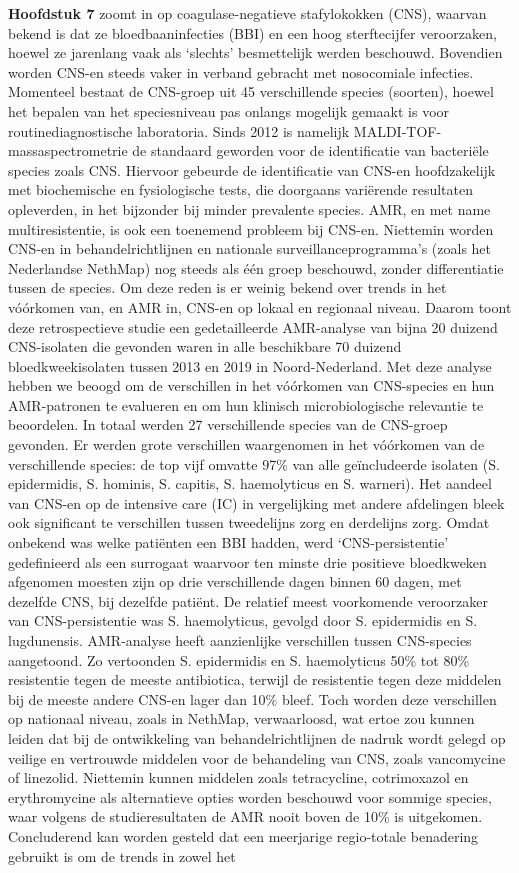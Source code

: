 \documentclass[
]{book}
\begin{document}
\textbf{Hoofdstuk 7} zoomt in op coagulase-negatieve stafylokokken (CNS), waarvan bekend is dat ze bloedbaaninfecties (BBI) en een hoog sterftecijfer veroorzaken, hoewel ze jarenlang vaak als `slechts' besmettelijk werden beschouwd. Bovendien worden CNS-en steeds vaker in verband gebracht met nosocomiale infecties. Momenteel bestaat de CNS-groep uit 45 verschillende species (soorten), hoewel het bepalen van het speciesniveau pas onlangs mogelijk gemaakt is voor routinediagnostische laboratoria. Sinds 2012 is namelijk MALDI-TOF-massaspectrometrie de standaard geworden voor de identificatie van bacteriële species zoals CNS. Hiervoor gebeurde de identificatie van CNS-en hoofdzakelijk met biochemische en fysiologische tests, die doorgaans variërende resultaten opleverden, in het bijzonder bij minder prevalente species. AMR, en met name multiresistentie, is ook een toenemend probleem bij CNS-en. Niettemin worden CNS-en in behandelrichtlijnen en nationale surveillanceprogramma's (zoals het Nederlandse NethMap) nog steeds als één groep beschouwd, zonder differentiatie tussen de species. Om deze reden is er weinig bekend over trends in het vóórkomen van, en AMR in, CNS-en op lokaal en regionaal niveau. Daarom toont deze retrospectieve studie een gedetailleerde AMR-analyse van bijna 20 duizend CNS-isolaten die gevonden waren in alle beschikbare 70 duizend bloedkweekisolaten tussen 2013 en 2019 in Noord-Nederland. Met deze analyse hebben we beoogd om de verschillen in het vóórkomen van CNS-species en hun AMR-patronen te evalueren en om hun klinisch microbiologische relevantie te beoordelen. In totaal werden 27 verschillende species van de CNS-groep gevonden. Er werden grote verschillen waargenomen in het vóórkomen van de verschillende species: de top vijf omvatte 97\% van alle geïncludeerde isolaten (S. epidermidis, S. hominis, S. capitis, S. haemolyticus en S. warneri). Het aandeel van CNS-en op de intensive care (IC) in vergelijking met andere afdelingen bleek ook significant te verschillen tussen tweedelijns zorg en derdelijns zorg. Omdat onbekend was welke patiënten een BBI hadden, werd `CNS-persistentie' gedefinieerd als een surrogaat waarvoor ten minste drie positieve bloedkweken afgenomen moesten zijn op drie verschillende dagen binnen 60 dagen, met dezelfde CNS, bij dezelfde patiënt. De relatief meest voorkomende veroorzaker van CNS-persistentie was S. haemolyticus, gevolgd door S. epidermidis en S. lugdunensis. AMR-analyse heeft aanzienlijke verschillen tussen CNS-species aangetoond. Zo vertoonden S. epidermidis en S. haemolyticus 50\% tot 80\% resistentie tegen de meeste antibiotica, terwijl de resistentie tegen deze middelen bij de meeste andere CNS-en lager dan 10\% bleef. Toch worden deze verschillen op nationaal niveau, zoals in NethMap, verwaarloosd, wat ertoe zou kunnen leiden dat bij de ontwikkeling van behandelrichtlijnen de nadruk wordt gelegd op veilige en vertrouwde middelen voor de behandeling van CNS, zoals vancomycine of linezolid. Niettemin kunnen middelen zoals tetracycline, cotrimoxazol en erythromycine als alternatieve opties worden beschouwd voor sommige species, waar volgens de studieresultaten de AMR nooit boven de 10\% is uitgekomen. Concluderend kan worden gesteld dat een meerjarige regio-totale benadering gebruikt is om de trends in zowel het 
\end{document}
